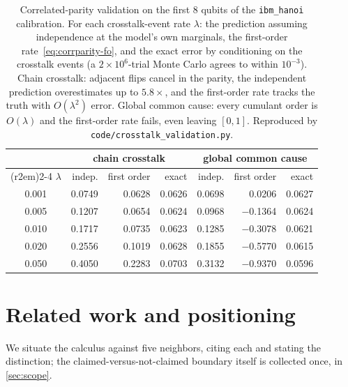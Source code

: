 \documentclass[12pt]{article}
\numberwithin{equation}{section}
\theoremstyle{plain}
\theoremstyle{definition}
\theoremstyle{remark}
\begin{document}
\begin{table}[t]
\centering
\caption{Correlated-parity validation on the first $8$ qubits of the
\texttt{ibm\_hanoi} calibration. For each crosstalk-event rate $\lambda$: the
prediction assuming independence at the model's own marginals, the first-order
rate~\eqref{eq:corrparity-fo}, and the exact error by conditioning on the
crosstalk events (a $2\times10^6$-trial Monte Carlo agrees to within
$10^{-3}$). Chain crosstalk: adjacent flips cancel in the parity, the
independent prediction overestimates up to $5.8\times$, and the first-order
rate tracks the truth with $O(\lambda^2)$ error. Global common cause: every
cumulant order is $O(\lambda)$ and the first-order rate fails, even leaving
$[0,1]$. Reproduced by \texttt{code/crosstalk\_validation.py}.}
\label{tab:crosstalk}
\small
\begin{tabular}{c rrr @{\hskip 2em} rrr}
\toprule
 & \multicolumn{3}{c}{chain crosstalk} & \multicolumn{3}{c}{global common cause} \\
\cmidrule(r{2em}){2-4} \cmidrule{5-7}
$\lambda$ & indep. & first order & exact & indep. & first order & exact \\
\midrule
0.001 & 0.0749 & 0.0628 & 0.0626 & 0.0698 & \phantom{$-$}0.0206 & 0.0627 \\
0.005 & 0.1207 & 0.0654 & 0.0624 & 0.0968 & $-$0.1364 & 0.0624 \\
0.010 & 0.1717 & 0.0735 & 0.0623 & 0.1285 & $-$0.3078 & 0.0621 \\
0.020 & 0.2556 & 0.1019 & 0.0628 & 0.1855 & $-$0.5770 & 0.0615 \\
0.050 & 0.4050 & 0.2283 & 0.0703 & 0.3132 & $-$0.9370 & 0.0596 \\
\bottomrule
\end{tabular}
\end{table}


\section{Related work and positioning}
\label{sec:related}

We situate the calculus against five neighbors, citing each and stating the
distinction; the claimed-versus-not-claimed boundary itself is collected once,
in \cref{sec:scope}.
\end{document}
